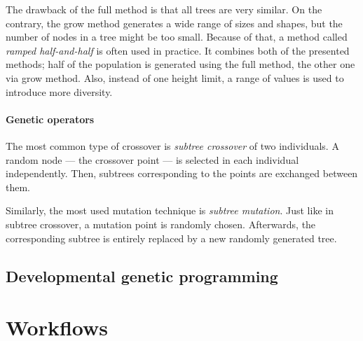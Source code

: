 The drawback of the full method is that all trees are very similar. On the
contrary, the grow method generates a wide range of sizes and shapes, but the
number of nodes in a tree might be too small. Because of that, a method called
\emph{ramped half-and-half} is often used in practice. It combines both 
of the presented methods; half of the population is generated using the full
method, the other one via grow method. Also, instead of one height limit, a
range of values is used to introduce more diversity.

\paragraph{Genetic operators}
The most common type of crossover is \emph{subtree crossover} of two
individuals. A random node --- the crossover point ---
is selected in each individual independently. Then, subtrees corresponding
to the points are exchanged between them.

Similarly, the most used mutation technique is \emph{subtree mutation}.
Just like in subtree crossover, a mutation point is randomly chosen.
Afterwards, the corresponding subtree is entirely replaced by a new randomly
generated tree.

\subsection{Developmental genetic programming}

\section{Workflows}